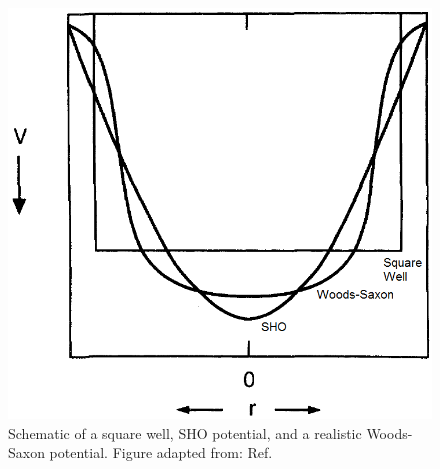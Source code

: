 \begin{figure}
\label{fig:chp2-SHOPot}
\centerline{\includegraphics[height=0.25\textheight]{./img/c2/sho_approx.png}}
	\caption{Schematic of a square well, SHO potential, and a realistic Woods-Saxon potential. Figure adapted from: Ref.\cite{casten}}
\end{figure}

